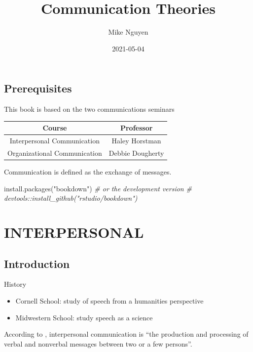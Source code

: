 \documentclass[
]{book}
\title{Communication Theories}
\author{Mike Nguyen}
\date{2021-05-04}
\newenvironment{Shaded}{\begin{snugshade}}{\end{snugshade}}
\newcommand{\CommentTok}[1]{\textcolor[rgb]{0.56,0.35,0.01}{\textit{#1}}}
\newcommand{\FunctionTok}[1]{\textcolor[rgb]{0.00,0.00,0.00}{#1}}
\newcommand{\NormalTok}[1]{#1}
\newcommand{\StringTok}[1]{\textcolor[rgb]{0.31,0.60,0.02}{#1}}
\providecommand{\tightlist}{%
  \setlength{\itemsep}{0pt}\setlength{\parskip}{0pt}}
\begin{document}
\maketitle

{
\setcounter{tocdepth}{1}
\tableofcontents
}
\hypertarget{prerequisites}{%
\chapter{Prerequisites}\label{prerequisites}}

This book is based on the two communications seminars

\begin{longtable}[]{@{}cc@{}}
\toprule
Course & Professor\tabularnewline
\midrule
\endhead
Interpersonal Communication & Haley Horstman\tabularnewline
Organizational Communication & Debbie Dougherty\tabularnewline
\bottomrule
\end{longtable}

Communication is defined as the exchange of messages.

\begin{Shaded}
\begin{Highlighting}[]
\FunctionTok{install.packages}\NormalTok{(}\StringTok{"bookdown"}\NormalTok{)}
\CommentTok{\# or the development version}
\CommentTok{\# devtools::install\_github("rstudio/bookdown")}
\end{Highlighting}
\end{Shaded}

\hypertarget{part-interpersonal}{%
\part{INTERPERSONAL}\label{part-interpersonal}}

\hypertarget{intro}{%
\chapter{Introduction}\label{intro}}

History

\begin{itemize}
\tightlist
\item
  Cornell School: study of speech from a humanities perspective
\item
  Midwestern School: study speech as a science
\end{itemize}

According to \citep{Baxter_2008}, interpersonal communication is ``the production and processing of verbal and nonverbal messages between two or a few persons''.
\end{document}

